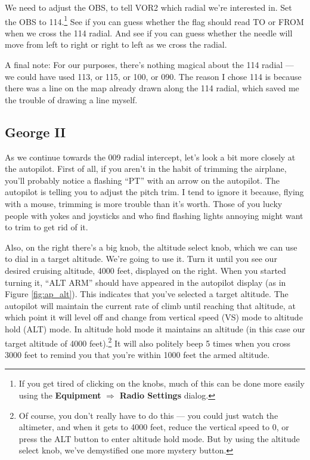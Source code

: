 We need to adjust the OBS, to tell VOR2 which radial we're interested
in.  Set the OBS to 114.\footnote{If you get tired of clicking on the knobs, much of
  this can be done more easily using the \textbf{\textsf{Equipment}}
  $\Rightarrow$ \textbf{\textsf{Radio Settings}} dialog.} See if you
can guess whether the flag should read TO or FROM when we cross the
114 radial.  And see if you can guess whether the needle will move
from left to right or right to left as we cross the radial.

A final note: For our purposes, there's nothing magical about the 114
radial --- we could have used 113, or 115, or 100, or 090.  The reason
I chose 114 is because there was a line on the map already drawn along
the 114 radial, which saved me the trouble of drawing a line myself.

\subsection{George II}

As we continue towards the 009 radial intercept, let's look a bit more
closely at the autopilot.  First of all, if you aren't in the habit of
trimming the airplane, you'll probably notice a flashing ``PT'' with
an arrow on the autopilot.  The autopilot is telling you to adjust the
pitch trim.  I tend to ignore it because, flying with a mouse,
trimming is more trouble than it's worth.  Those of you lucky people
with yokes and joysticks and who find flashing lights annoying might
want to trim to get rid of it.

Also, on the right there's a big knob, the altitude select knob, which
we can use to dial in a target altitude.  We're going to use it.  Turn
it until you see our desired cruising altitude, 4000 feet, displayed
on the right.  When you started turning it, ``ALT ARM'' should have
appeared in the autopilot display (as in Figure \ref{fig:ap_alt}).
This indicates that you've selected a target
altitude.  The
autopilot will maintain the current rate of climb until reaching that
altitude, at which point it will level off and change from vertical
speed (VS) mode to altitude hold (ALT) mode.  In altitude hold mode it
maintains an altitude (in this case our target altitude of 4000
feet).\footnote{ Of course, you don't really have to do this --- you
  could just watch the altimeter, and when it gets to 4000 feet,
  reduce the vertical speed to 0, or press the ALT button to enter
  altitude hold mode.  But by using the altitude select knob, we've
  demystified one more mystery button.}  It will also politely beep 5
times when you cross 3000 feet to remind you that you're within 1000
feet the armed altitude.

